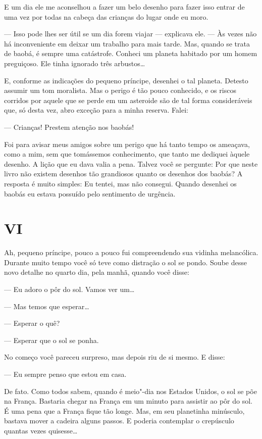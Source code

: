 \begin{Parallel}[p]{}{}
{E um dia ele me aconselhou a fazer um belo desenho para fazer isso
entrar de uma vez por todas na cabeça das crianças do lugar onde eu
moro.

--- Isso pode lhes ser útil se um dia forem viajar --- explicava ele. --- Às
vezes não há inconveniente em deixar um trabalho para mais tarde. Mas,
quando se trata de baobá, é sempre uma catástrofe. Conheci um planeta
habitado por um homem preguiçoso. Ele tinha ignorado três arbustos\ldots{}

E, conforme as indicações do pequeno príncipe, desenhei o tal planeta.
Detesto assumir um tom moralista. Mas o perigo é tão pouco conhecido, e
os riscos corridos por aquele que se perde em um asteroide são de tal
forma consideráveis que, só desta vez, abro exceção para a minha
reserva. Falei:

--- Crianças! Prestem atenção nos baobás!

Foi para avisar meus amigos sobre um perigo que há tanto tempo os
ameaçava, como a mim, sem que tomássemos conhecimento, que tanto me
dediquei àquele desenho. A lição que eu dava valia a pena. Talvez você
se pergunte: Por que neste livro não existem desenhos tão grandiosos
quanto os desenhos dos baobás? A resposta é muito simples: Eu tentei,
mas não consegui. Quando desenhei os baobás eu estava possuído pelo
sentimento de urgência.

\section{VI}

Ah, pequeno príncipe, pouco a pouco fui compreendendo sua vidinha
melancólica. Durante muito tempo você só teve como distração o sol se
pondo. Soube desse novo detalhe no quarto dia, pela manhã, quando você
disse:

--- Eu adoro o pôr do sol. Vamos ver um\ldots{}

--- Mas temos que esperar\ldots{}

--- Esperar o quê?

--- Esperar que o sol se ponha.

No começo você pareceu surpreso, mas depois riu de si mesmo. E disse:

--- Eu sempre penso que estou em casa.

De fato. Como todos sabem, quando é meio"-dia nos Estados Unidos, o sol
se põe na França. Bastaria chegar na França em um minuto para assistir
ao pôr do sol. É uma pena que a França fique tão longe. Mas, em seu
planetinha minúsculo, bastava mover a cadeira alguns passos. E poderia
contemplar o crepúsculo quantas vezes quisesse\ldots{}

}
\end{Parallel}
